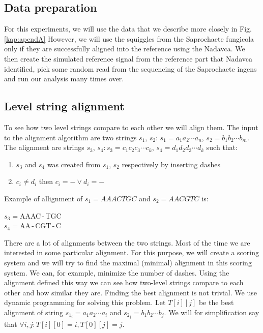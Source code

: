 \subsection{Data preparation}

For this experiments, we will use the data that we describe more closely in Fig. \ref{kap:apendA}
However, we will use the squiggles from the Saprochaete fungicola only if they
are successfully aligned into the reference using the Nadavca. We then create the
simulated reference signal from the reference part that Nadavca identified, pick
some random read from the sequencing of the Saprochaete ingens and run our analysis
many times over.

\subsection{Level string alignment}

To see how two level strings compare to each other we will align them. The input
to the alignment algorithm are two strings $s_1$, $s_2$:
$s_1=a_1a_2\cdots a_n$, $s_2=b_1b_2\cdots b_m$. The alignment are strings
$s_3$, $s_4: s_3 = c_1c_2c_3\cdots c_k$, $s_4 = d_1d_2d_3\cdots d_k$ such that:

\begin{enumerate}
\item $s_3$ and $s_4$ was created from $s_1$, $s_2$ respectively by inserting dashes
\item $c_i \neq d_i$ then $c_i = - \lor d_i = -$
\end{enumerate}

Example of allignment of $s_1 = AAACTGC$ and $s_2 = AACGTC$ is:

\begin{center}
$s_3 = $AAAC\,-\,TGC\\
$s_4 = $AA\,-\,CGT\,-\,C
\end{center}

There are a lot of alignments between the two strings. Most of the time we
are interested in some particular alignment. For this purpose, we will create a
scoring system and we will try to find the maximal (minimal) alignment in this scoring
system. We can, for example, minimize the number of dashes. Using the alignment
defined this way we can see how two-level strings compare to each other and how similar they are.
Finding the best alignment is not trivial. We use dynamic programming for
solving this problem. Let $T[i][j]$ be the best alignment of string $s_{1_i} = a_1a_2\cdots a_i$
and $s_{2_j} = b_1b_2\cdots b_j$. We will for simplification say that $\forall i, j: T[i][0] = i, T[0][j] = j$.

